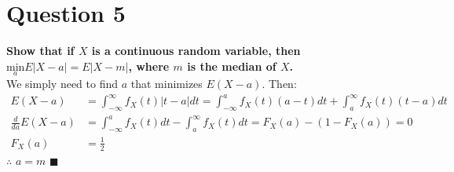\documentclass{article}
\newcommand{\intinf}{\int_{-\infty}^{\infty}}
\begin{document}

\section*{Question 5}
\textbf{Show that if $X$ is a continuous random variable, then $\underset{a}{\text{min}}E|X-a|=E|X-m|$, where $m$ is the median of $X$.}
\bigskip \\
We simply need to find $a$ that minimizes $E(X-a)$. Then:
\begin{align*}
	E(X-a)				&=  \intinf f_X(t)|t-a|dt = \int_{-\infty}^a f_X(t)(a-t)dt + \int_a^\infty f_X(t)(t-a)dt	\\
	\frac{d}{da}E(X-a)	&= \int_{-\infty}^a f_X(t)dt - \int_a^\infty f_X(t)dt = F_X(a) - (1 - F_X(a)) = 0			\\
	F_X(a)				&= \frac{1}{2}
\end{align*}
$\therefore$ $a=m$	$\blacksquare$


\end{document}
